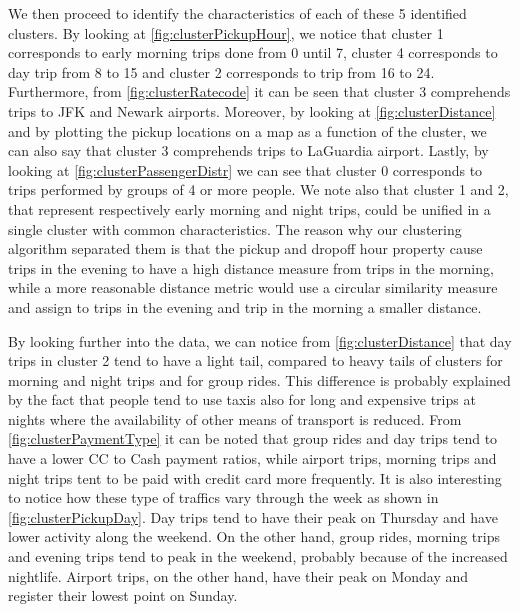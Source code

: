 \documentclass{acm_proc_article-sp-sigmod09}
\begin{document}
We then proceed to identify the characteristics of each of these 5 identified clusters. By looking at \cref{fig:clusterPickupHour}, we notice that cluster 1 corresponds to early morning trips done from 0 until 7, cluster 4 corresponds to day trip from 8 to 15 and cluster 2 corresponds to trip from 16 to 24. Furthermore, from \cref{fig:clusterRatecode} it can be seen that cluster 3 comprehends trips to JFK and Newark airports. Moreover, by looking at \cref{fig:clusterDistance} and by plotting the pickup locations on a map as a function of the cluster, we can also say that cluster 3 comprehends trips to LaGuardia airport. Lastly, by looking at \cref{fig:clusterPassengerDistr} we can see that cluster 0 corresponds to trips performed by groups of 4 or more people. We note also that cluster 1 and 2, that represent respectively early morning and night trips, could be unified in a single cluster with common characteristics. The reason why our clustering algorithm separated them is that the pickup and dropoff hour property cause trips in the evening to have a high distance measure from trips in the morning, while a more reasonable distance metric would use a circular similarity measure and assign to trips in the evening and trip in the morning a smaller distance.

By looking further into the data, we can notice from \cref{fig:clusterDistance} that day trips in cluster 2 tend to have a light tail, compared to heavy tails of clusters for morning and night trips and for group rides. This difference is probably explained by the fact that people tend to use taxis also for long and expensive trips at nights where the availability of other means of transport is reduced. From \cref{fig:clusterPaymentType} it can be noted that group rides and day trips tend to have a lower CC to Cash payment ratios, while airport trips, morning trips and night trips tent to be paid with credit card more frequently. It is also interesting to notice how these type of traffics vary through the week as shown in \cref{fig:clusterPickupDay}. Day trips tend to have their peak on Thursday and have lower activity along the weekend. On the other hand, group rides, morning trips and evening trips tend to peak in the weekend, probably because of the increased nightlife. Airport trips, on the other hand, have their peak on Monday and register their lowest point on Sunday.
\end{document}
